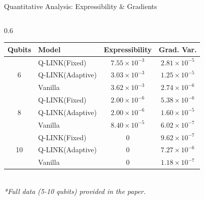 \documentclass[aspectratio=169,xcolor=dvipsnames]{beamer}
\begin{document}
\begin{frame}{Quantitative Analysis: Expressibility \& Gradients}
\begin{columns}[c, onlytextwidth]
        
        \begin{column}{0.6\textwidth}
            \centering
            \tiny 
            \renewcommand{\arraystretch}{1.1} 
            \begin{tabular}{c l c c}
                \toprule
                \textbf{Qubits} & \textbf{Model} & \textbf{Expressibility} & \textbf{Grad. Var.} \\
                \midrule
                \multirow{3}{*}{6} 
                & Q-LINK(Fixed) & $7.55\times 10^{-3}$ & $2.81\times 10^{-5}$ \\
                & Q-LINK(Adaptive) & $3.03\times 10^{-3}$ & $1.25\times 10^{-5}$ \\
                & Vanilla & $3.62\times 10^{-3}$ & $2.74\times 10^{-6}$ \\
                \hline
                \multirow{3}{*}{8} 
                & Q-LINK(Fixed) & $2.00\times 10^{-6}$ & $5.38\times 10^{-6}$ \\
                & Q-LINK(Adaptive) & $2.00\times 10^{-6}$ & $1.60\times 10^{-5}$ \\
                & Vanilla & $8.40\times 10^{-5}$ & $6.02\times 10^{-7}$ \\
                \hline
                \multirow{3}{*}{10} 
                & Q-LINK(Fixed) & $0$ & $9.62\times 10^{-7}$ \\
                & Q-LINK(Adaptive) & $0$ & $7.27\times 10^{-6}$ \\
                & Vanilla & $0$ & $1.18\times 10^{-7}$ \\
                \bottomrule
            \end{tabular}
            \vspace{5pt}
            \\ \textit{*Full data (5-10 qubits) provided in the paper.}
        \end{column}
    \end{columns}
\end{frame}
\end{document}
